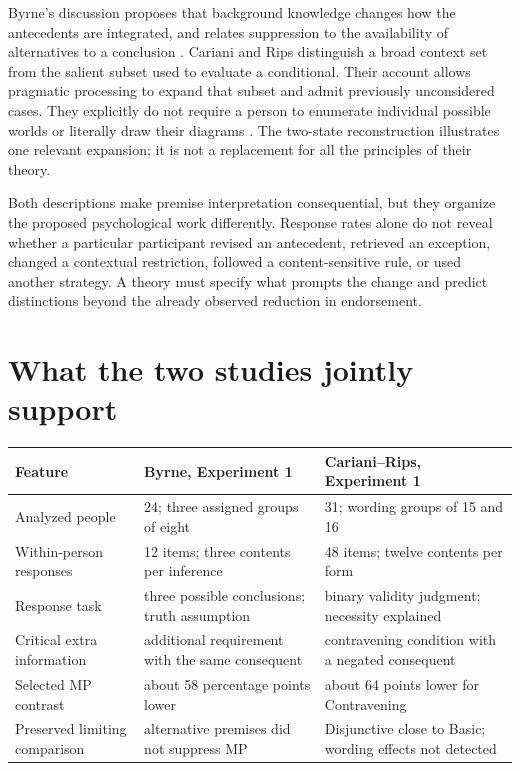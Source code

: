 Byrne's discussion proposes that background knowledge changes how the
antecedents are integrated, and relates suppression to the availability
of alternatives to a conclusion \cite[pp.~76--79]{Byrne1989Suppression}.
Cariani and Rips distinguish a broad context set from the salient subset
used to evaluate a conditional. Their account allows pragmatic processing
to expand that subset and admit previously unconsidered cases. They
explicitly do not require a person to enumerate individual possible
worlds or literally draw their diagrams
\cite[Secs.~3.1--4.2, 5.1--5.2]{CarianiRips2017Suppression}.
The two-state reconstruction illustrates one relevant expansion; it is
not a replacement for all the principles of their theory.

Both descriptions make premise interpretation consequential, but they
organize the proposed psychological work differently. Response rates alone
do not reveal whether a particular participant revised an antecedent,
retrieved an exception, changed a contextual restriction, followed a
content-sensitive rule, or used another strategy. A theory must specify
what prompts the change and predict distinctions beyond the already
observed reduction in endorsement.

\section{What the two studies jointly support}
\label{sec:p19-suppression-comparison}

\begin{center}
\begin{tabularx}{\textwidth}{@{}l X X@{}}
\toprule
Feature & Byrne, Experiment 1 & Cariani--Rips, Experiment 1\\\midrule
Analyzed people & 24; three assigned groups of eight & 31; wording groups of 15 and 16\\
Within-person responses & 12 items; three contents per inference & 48 items; twelve contents per form\\
Response task & three possible conclusions; truth assumption & binary validity judgment; necessity explained\\
Critical extra information & additional requirement with the same consequent & contravening condition with a negated consequent\\
Selected MP contrast & about 58 percentage points lower & about 64 points lower for Contravening\\
Preserved limiting comparison & alternative premises did not suppress MP & Disjunctive close to Basic; wording effects not detected\\
\bottomrule
\end{tabularx}
\end{center}


